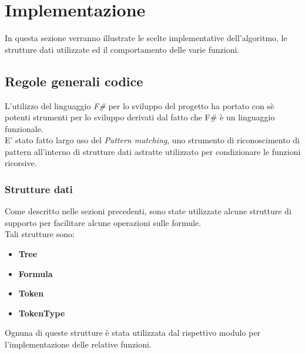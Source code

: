 \documentclass[\main/tesi.tex]{subfiles}
\begin{document}
\chapter{Implementazione}

In questa sezione verranno illustrate le scelte implementative dell'algoritmo, le strutture dati utilizzate ed il comportamento delle varie funzioni. \\

\section{Regole generali codice}
L'utilizzo del linguaggio \textit{F\#} \cite{fsharp} per lo sviluppo del progetto ha portato con sè potenti strumenti per lo sviluppo derivati dal fatto che F\# \cite{fsharp} è un linguaggio funzionale. \\
E' stato fatto largo uso del \textit{Pattern matching}, uno strumento di riconoscimento di pattern all'interno di strutture dati astratte utilizzato per condizionare le funzioni ricorsive. \\

\subsection{Strutture dati}
Come descritto nelle sezioni precedenti, sono state utilizzate alcune strutture di supporto per facilitare alcune operazioni sulle formule. \\
Tali strutture sono:
\begin{itemize}
    \item \textbf{Tree}
    \item \textbf{Formula}
    \item \textbf{Token}
    \item \textbf{TokenType}
\end{itemize}
Ognuna di queste strutture è stata utilizzata dal rispettivo modulo per l'implementazione delle relative funzioni.
\end{document}
